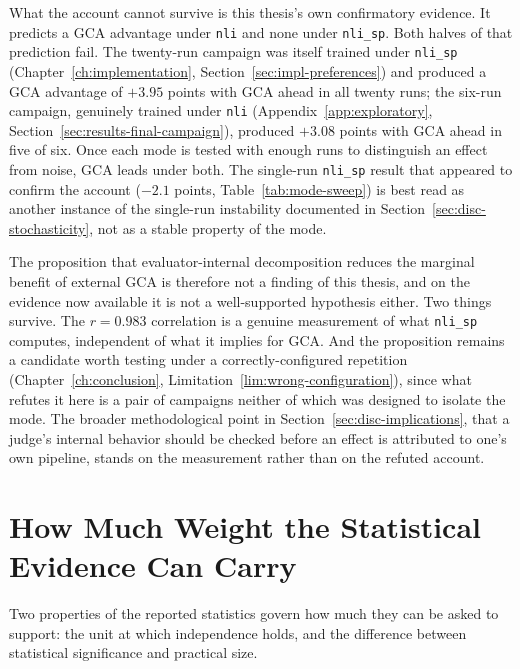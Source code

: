 What the account cannot survive is this thesis's own confirmatory evidence. It
predicts a GCA advantage under \texttt{nli} and none under \texttt{nli\_sp}.
Both halves of that prediction fail. The twenty-run campaign was itself trained
under \texttt{nli\_sp} (Chapter~\ref{ch:implementation},
Section~\ref{sec:impl-preferences}) and produced a GCA advantage of $+3.95$
points with GCA ahead in all twenty runs; the six-run campaign, genuinely
trained under \texttt{nli} (Appendix~\ref{app:exploratory},
Section~\ref{sec:results-final-campaign}), produced $+3.08$ points with GCA
ahead in five of six. Once each mode is tested with enough runs to distinguish
an effect from noise, GCA leads under both. The single-run \texttt{nli\_sp}
result that appeared to confirm the account ($-2.1$ points,
Table~\ref{tab:mode-sweep}) is best read as another instance of the single-run
instability documented in Section~\ref{sec:disc-stochasticity}, not as a stable
property of the mode.

The proposition that evaluator-internal decomposition reduces the marginal
benefit of external GCA is therefore not a finding of this thesis, and on the
evidence now available it is not a well-supported hypothesis either. Two
things survive. The $r=0.983$ correlation is a genuine measurement of what
\texttt{nli\_sp} computes, independent of what it implies for GCA. And the
proposition remains a candidate worth testing under a correctly-configured
repetition (Chapter~\ref{ch:conclusion}, Limitation~\ref{lim:wrong-configuration}), since
what refutes it here is a pair of campaigns neither of which was designed to
isolate the mode. The broader methodological point in
Section~\ref{sec:disc-implications}, that a judge's internal behavior should be
checked before an effect is attributed to one's own pipeline, stands on the
measurement rather than on the refuted account.


\section{How Much Weight the Statistical Evidence Can Carry}
\label{sec:disc-stats-caveat}

Two properties of the reported statistics govern how much they can be asked to
support: the unit at which independence holds, and the difference between
statistical significance and practical size.

